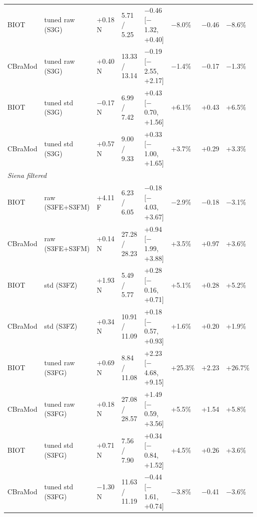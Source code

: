 \begin{table}[!htbp]
\begin{tabular}{llllllll}
BIOT & tuned raw (S3G) & +0.18 N & 5.71 / 5.25 & $-$0.46 [$-$1.32, +0.40] & $-$8.0\% & $-$0.46 & $-$8.6\%\\
CBraMod & tuned raw (S3G) & +0.40 N & 13.33 / 13.14 & $-$0.19 [$-$2.55, +2.17] & $-$1.4\% & $-$0.17 & $-$1.3\%\\
BIOT & tuned std (S3G) & $-$0.17 N & 6.99 / 7.42 & +0.43 [$-$0.70, +1.56] & +6.1\% & +0.43 & +6.5\%\\
CBraMod & tuned std (S3G) & +0.57 N & 9.00 / 9.33 & +0.33 [$-$1.00, +1.65] & +3.7\% & +0.29 & +3.3\%\\
\multicolumn{8}{l}{\emph{Siena filtered}}\\
BIOT & raw (S3FE+S3FM) & +4.11 F & 6.23 / 6.05 & $-$0.18 [$-$4.03, +3.67] & $-$2.9\% & $-$0.18 & $-$3.1\%\\
CBraMod & raw (S3FE+S3FM) & +0.14 N & 27.28 / 28.23 & +0.94 [$-$1.99, +3.88] & +3.5\% & +0.97 & +3.6\%\\
BIOT & std (S3FZ) & +1.93 N & 5.49 / 5.77 & +0.28 [$-$0.16, +0.71] & +5.1\% & +0.28 & +5.2\%\\
CBraMod & std (S3FZ) & +0.34 N & 10.91 / 11.09 & +0.18 [$-$0.57, +0.93] & +1.6\% & +0.20 & +1.9\%\\
BIOT & tuned raw (S3FG) & +0.69 N & 8.84 / 11.08 & +2.23 [$-$4.68, +9.15] & +25.3\% & +2.23 & +26.7\%\\
CBraMod & tuned raw (S3FG) & +0.18 N & 27.08 / 28.57 & +1.49 [$-$0.59, +3.56] & +5.5\% & +1.54 & +5.8\%\\
BIOT & tuned std (S3FG) & +0.71 N & 7.56 / 7.90 & +0.34 [$-$0.84, +1.52] & +4.5\% & +0.26 & +3.6\%\\
CBraMod & tuned std (S3FG) & $-$1.30 N & 11.63 / 11.19 & $-$0.44 [$-$1.61, +0.74] & $-$3.8\% & $-$0.41 & $-$3.6\%\\
\bottomrule
\end{tabular}
\end{table}

